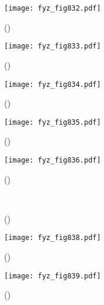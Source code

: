     \begin{figure}[ht!] %
      \centering
      \texttt{[image: fyz\_fig832.pdf]}
      \caption{
               (\cite[s.~707]{Feynman02})}
      \label{fyz:fig832}
    \end{figure}
    
    \begin{figure}[ht!] %
      \centering
      \texttt{[image: fyz\_fig833.pdf]}
      \caption{
               (\cite[s.~707]{Feynman02})}
      \label{fyz:fig833}
    \end{figure}
    
    \begin{figure}[ht!] %
      \centering
      \texttt{[image: fyz\_fig834.pdf]}
      \caption{
               (\cite[s.~707]{Feynman02})}
      \label{fyz:fig834}
    \end{figure}
    
    \begin{figure}[ht!] %
      \centering
      \texttt{[image: fyz\_fig835.pdf]}
      \caption{
               (\cite[s.~707]{Feynman02})}
      \label{fyz:fig835}
    \end{figure}
    
    \begin{figure}[ht!] %
      \centering
      \texttt{[image: fyz\_fig836.pdf]}
      \caption{
               (\cite[s.~707]{Feynman02})}
      \label{fyz:fig836}
    \end{figure}

    \begin{figure}[ht!] %
      \centering
                     \\
      \caption{
               (\cite[s.~748]{Feynman02})}
      \label{fyz:fig837}
    \end{figure}

    \begin{figure}[ht!] %
      \centering
      \texttt{[image: fyz\_fig838.pdf]}
      \caption{
               (\cite[s.~707]{Feynman02})}
      \label{fyz:fig838}
    \end{figure}

    \begin{figure}[ht!] %
      \centering
      \texttt{[image: fyz\_fig839.pdf]}
      \caption{
               (\cite[s.~707]{Feynman02})}
      \label{fyz:fig839}
    \end{figure}

